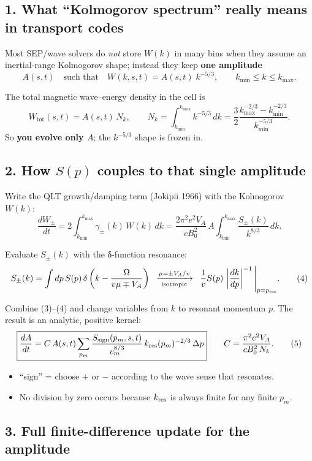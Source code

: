 \subsection*{1. What “Kolmogorov spectrum” really means in transport codes}

Most SEP/wave solvers do \emph{not} store $W(k)$ in many bins when they assume an inertial-range Kolmogorov shape; instead they keep \textbf{one amplitude}
\[
A(s,t)\quad\text{such that}\quad 
W(k,s,t) = A(s,t)\;k^{-5/3},\qquad k_{\min} \le k \le k_{\max}. \tag{1}
\]

The total magnetic wave–energy density in the cell is
\[
W_{\text{tot}}(s,t) = A(s,t)\,N_k,
\qquad
N_k = \int_{k_{\min}}^{k_{\max}} k^{-5/3}\,dk
     = \frac{3}{2}\frac{k_{\max}^{-2/3}-k_{\min}^{-2/3}}{k_{\min}^{-5/3}}. \tag{2}
\]
So \textbf{you evolve only $A$}; the $k^{-5/3}$ shape is frozen in.

\subsection*{2. How $S(p)$ couples to that single amplitude}

Write the QLT growth/damping term (Jokipii 1966) with the Kolmogorov $W(k)$:
\[
\frac{dW_{\pm}}{dt}
= 2 \int_{k_{\min}}^{k_{\max}} \gamma_\pm(k)\,W(k)\,dk
= \frac{2\pi^{2}e^{2}V_A}{cB_0^{2}}\,
A \int_{k_{\min}}^{k_{\max}} \frac{S_\pm(k)}{k^{8/3}}\,dk. \tag{3}
\]

Evaluate $S_\pm(k)$ with the δ-function resonance:
\[
S_\pm(k) = \int dp\, S(p)\,
\delta\left(k - \frac{\Omega}{v\mu \mp V_A}\right)
\;\;\xrightarrow[\text{isotropic}]{\mu = \pm V_A/v}\;\;
\frac{1}{v} S(p)\, \left| \frac{dk}{dp} \right|^{-1}
\Bigg|_{p=p_{\rm res}}. \tag{4}
\]

Combine (3)–(4) and change variables from $k$ to resonant momentum $p$. The result is an analytic, positive kernel:
\[
\boxed{
\frac{dA}{dt} = C\,A(s,t)
\sum_{p_m} 
\frac{S_{\text{sign}}(p_m,s,t)}{v_m^{8/3}}\,
k_{\rm res}(p_m)^{-2/3}\,\Delta p
}
\qquad
C = \frac{\pi^{2}e^{2}V_A}{cB_0^{2}\,N_k}. \tag{5}
\]

\begin{itemize}
\item ``sign'' = choose $+$ or $−$ according to the wave sense that resonates.
\item No division by zero occurs because $k_{\rm res}$ is always finite for any finite $p_m$.
\end{itemize}

\subsection*{3. Full finite-difference update for the amplitude}

